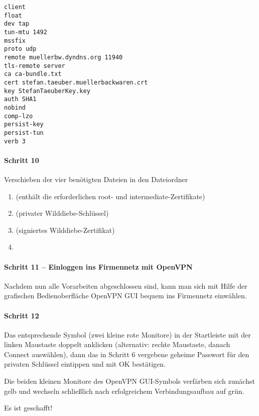 \begin{lstlisting}[keywordstyle=\color{black}]
client
float
dev tap
tun-mtu 1492
mssfix
proto udp
remote muellerbw.dyndns.org 11940
tls-remote server
ca ca-bundle.txt
cert stefan.taeuber.muellerbackwaren.crt
key StefanTaeuberKey.key
auth SHA1
nobind
comp-lzo
persist-key
persist-tun
verb 3
\end{lstlisting}

\paragraph{Schritt 10}

Verschieben der vier benötigten Dateien in den Dateiordner

\begin{enumerate}
  \item {} (enthält die erforderlichen root- und intermediate\hyp Zertifikate)
  \item {} (privater \glqq{}Wilddiebe-Schlüssel\grqq{})
  \item {} (signiertes \glqq{}Wilddiebe\hyp Zertifikat\grqq{})
  \item {} 
\end{enumerate}

\paragraph{Schritt 11 -- Einloggen ins Firmennetz mit OpenVPN}

Nachdem nun alle Vorarbeiten abgeschlossen sind, kann man sich mit Hilfe der
grafischen Bedienoberfläche OpenVPN GUI bequem ins Firmennetz einwählen.

\paragraph{Schritt 12}

Das entsprechende Symbol (zwei kleine rote Monitore) in der Startleiste mit der
linken Maustaste doppelt anklicken (alternativ: rechte Maustaste, danach
\glqq{}Connect\grqq{} auswählen), dann das in Schritt 6 vergebene geheime Passwort für den
privaten Schlüssel eintippen und mit \glqq{}OK\grqq{} bestätigen.

Die beiden kleinen Monitore des OpenVPN GUI-Symbols verfärben sich zunächst gelb
und wechseln schließlich nach erfolgreichem Verbindungsaufbau auf grün.

Es ist geschafft!

